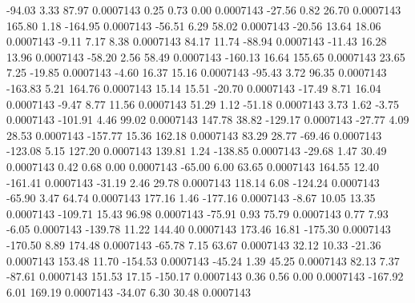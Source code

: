       -94.03        3.33       87.97     0.0007143
        0.25        0.73        0.00     0.0007143
      -27.56        0.82       26.70     0.0007143
      165.80        1.18     -164.95     0.0007143
      -56.51        6.29       58.02     0.0007143
      -20.56       13.64       18.06     0.0007143
       -9.11        7.17        8.38     0.0007143
       84.17       11.74      -88.94     0.0007143
      -11.43       16.28       13.96     0.0007143
      -58.20        2.56       58.49     0.0007143
     -160.13       16.64      155.65     0.0007143
       23.65        7.25      -19.85     0.0007143
       -4.60       16.37       15.16     0.0007143
      -95.43        3.72       96.35     0.0007143
     -163.83        5.21      164.76     0.0007143
       15.14       15.51      -20.70     0.0007143
      -17.49        8.71       16.04     0.0007143
       -9.47        8.77       11.56     0.0007143
       51.29        1.12      -51.18     0.0007143
        3.73        1.62       -3.75     0.0007143
     -101.91        4.46       99.02     0.0007143
      147.78       38.82     -129.17     0.0007143
      -27.77        4.09       28.53     0.0007143
     -157.77       15.36      162.18     0.0007143
       83.29       28.77      -69.46     0.0007143
     -123.08        5.15      127.20     0.0007143
      139.81        1.24     -138.85     0.0007143
      -29.68        1.47       30.49     0.0007143
        0.42        0.68        0.00     0.0007143
      -65.00        6.00       63.65     0.0007143
      164.55       12.40     -161.41     0.0007143
      -31.19        2.46       29.78     0.0007143
      118.14        6.08     -124.24     0.0007143
      -65.90        3.47       64.74     0.0007143
      177.16        1.46     -177.16     0.0007143
       -8.67       10.05       13.35     0.0007143
     -109.71       15.43       96.98     0.0007143
      -75.91        0.93       75.79     0.0007143
        0.77        7.93       -6.05     0.0007143
     -139.78       11.22      144.40     0.0007143
      173.46       16.81     -175.30     0.0007143
     -170.50        8.89      174.48     0.0007143
      -65.78        7.15       63.67     0.0007143
       32.12       10.33      -21.36     0.0007143
      153.48       11.70     -154.53     0.0007143
      -45.24        1.39       45.25     0.0007143
       82.13        7.37      -87.61     0.0007143
      151.53       17.15     -150.17     0.0007143
        0.36        0.56        0.00     0.0007143
     -167.92        6.01      169.19     0.0007143
      -34.07        6.30       30.48     0.0007143
